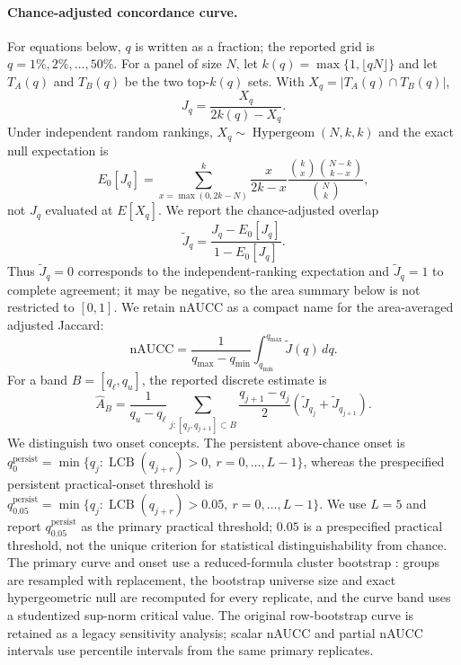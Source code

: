 \documentclass[11pt]{article}
\begin{document}
\paragraph{Chance-adjusted concordance curve.}
For equations below, $q$ is written as a fraction; the reported grid is $q=1\%,2\%,\dots,50\%$.
For a panel of size $N$, let $k(q)=\max\{1,\lfloor qN\rfloor\}$ and let $T_A(q)$ and $T_B(q)$ be the two top-$k(q)$ sets. With $X_q=|T_A(q)\cap T_B(q)|$,
\[
J_q=\frac{X_q}{2k(q)-X_q}.
\]
Under independent random rankings, $X_q\sim\operatorname{Hypergeom}(N,k,k)$ and the exact null expectation is
\[
E_0[J_q]=\sum_{x=\max(0,2k-N)}^k
\frac{x}{2k-x}\frac{\binom{k}{x}\binom{N-k}{k-x}}{\binom{N}{k}},
\]
not $J_q$ evaluated at $E[X_q]$. We report the chance-adjusted overlap
\begin{equation}
\widetilde J_q = \frac{J_q - E_0[J_q]}{1 - E_0[J_q]}.
\end{equation}
Thus $\widetilde J_q=0$ corresponds to the independent-ranking expectation and $\widetilde J_q=1$ to complete agreement; it may be negative, so the area summary below is not restricted to $[0,1]$.
We retain nAUCC as a compact name for the area-averaged adjusted Jaccard:
\begin{equation}
\mathrm{nAUCC} = \frac{1}{q_{\max}-q_{\min}} \int_{q_{\min}}^{q_{\max}} \widetilde J(q) \,dq.
\end{equation}
For a band $B=[q_\ell,q_u]$, the reported discrete estimate is
\[
\widehat A_B=\frac{1}{q_u-q_\ell}\sum_{j:[q_j,q_{j+1}]\subset B}
\frac{q_{j+1}-q_j}{2}\left(\widetilde J_{q_j}+\widetilde J_{q_{j+1}}\right).
\]
We distinguish two onset concepts. The persistent above-chance onset is $q^{\mathrm{persist}}_{0}=\min\{q_j:\operatorname{LCB}(q_{j+r})>0,\ r=0,\ldots,L-1\}$, whereas the prespecified persistent practical-onset threshold is $q^{\mathrm{persist}}_{0.05}=\min\{q_j:\operatorname{LCB}(q_{j+r})>0.05,\ r=0,\ldots,L-1\}$. We use $L=5$ and report $q^{\mathrm{persist}}_{0.05}$ as the primary practical threshold; $0.05$ is a prespecified practical threshold, not the unique criterion for statistical distinguishability from chance.
The primary curve and onset use a reduced-formula cluster bootstrap \cite{efron1994,romano2005}: groups are resampled with replacement, the bootstrap universe size and exact hypergeometric null are recomputed for every replicate, and the curve band uses a studentized sup-norm critical value. The original row-bootstrap curve is retained as a legacy sensitivity analysis; scalar nAUCC and partial nAUCC intervals use percentile intervals from the same primary replicates.
\end{document}
